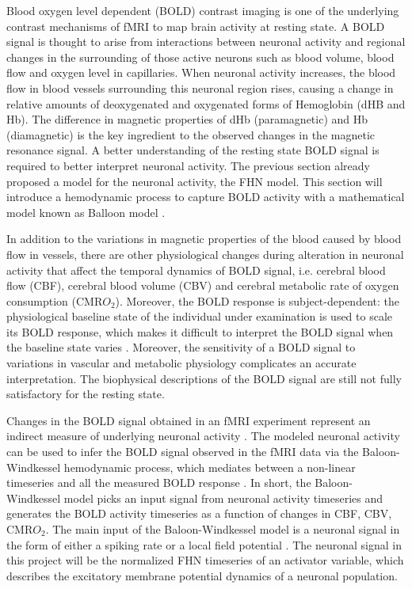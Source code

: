 Blood oxygen level dependent (BOLD) contrast imaging is one of the underlying contrast mechanisms of fMRI to map brain activity at resting state. A BOLD signal is thought to arise from interactions between neuronal activity and regional changes in the surrounding of those active neurons such as blood volume, blood flow and  oxygen level in capillaries. When neuronal activity increases, the blood flow in blood vessels surrounding this neuronal region rises, causing a change in relative amounts of deoxygenated and oxygenated forms of Hemoglobin (dHB and Hb). The difference in magnetic properties of dHb (paramagnetic) and Hb (diamagnetic) is the key ingredient to the observed changes in the magnetic resonance signal. A better understanding of the resting state BOLD signal is required to better interpret neuronal activity. The previous section already proposed  a model for the neuronal activity, the FHN model. This section will introduce a hemodynamic process to capture BOLD activity with a mathematical model known as Balloon model \citep{XYZ98}. 

In addition to the variations in magnetic properties of the blood caused by blood flow in vessels, there are other physiological changes during alteration in neuronal activity that affect the temporal dynamics of BOLD signal, i.e. cerebral blood flow (CBF), cerebral blood volume (CBV) and cerebral metabolic rate of oxygen consumption (CMR$O_2$). Moreover, the BOLD response is subject-dependent: the physiological baseline state of the individual under examination is used to scale its BOLD response, which makes it difficult to interpret the BOLD signal when the baseline state varies \citep{XYZ2013}. Moreover, the sensitivity of a BOLD signal to variations in vascular and metabolic physiology complicates an accurate interpretation. The biophysical descriptions of the BOLD signal are still not fully satisfactory for the resting state. 

Changes in the BOLD signal obtained in an fMRI experiment represent an indirect measure of underlying neuronal activity \citep{VUK14}. The modeled neuronal activity can be used to infer the BOLD signal observed in the fMRI data via the Baloon-Windkessel hemodynamic process, which mediates between a non-linear timeseries and all the measured BOLD response \citep{FRI00}. In short, the Baloon-Windkessel model picks an input signal from neuronal activity timeseries and generates the BOLD activity timeseries as a function of changes in CBF, CBV, CMR$O_2$. The main input of the Baloon-Windkessel model is a neuronal signal in the form of either a spiking rate or a local field potential \citep{SET12}. The neuronal signal in this project will be the normalized FHN timeseries of an activator variable, which describes the excitatory membrane potential dynamics of a neuronal population.       

